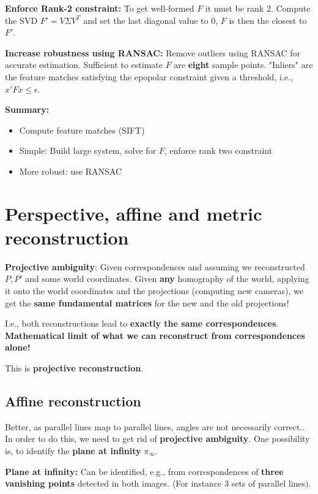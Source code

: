 \textbf{Enforce Rank-2 constraint:} To get well-formed $F$ it must be rank 2. Compute the SVD $F' = V \Sigma V^T$ and set the last diagonal value to $0$, $F$ is then the closest to $F'$.

\textbf{Increase robustness using RANSAC:} Remove outliers using RANSAC for accurate estimation. Sufficient to estimate $F$ are \textbf{eight} sample points. "Inliers" are the feature matches satisfying the epopolar constraint given a threshold, i.e., $x' F x \leq \epsilon$.

\textbf{Summary:}

\begin{itemize}
    \item Compute feature matches (SIFT)
    \item Simple: Build large system, solve for $F$, enforce rank two constraint
    \item More robust: use RANSAC
\end{itemize}

\section{Perspective, affine and metric reconstruction}

\textbf{Projective ambiguity}: Given correspondences and assuming we reconstructed $P,P'$ and some world coordinates. Given \textbf{any} homography of the world, applying it onto the world coordinates and the projections (computing new cameras), we get the \textbf{same fundamental matrices} for the new and the old projections!

I.e., both reconstructions lead to \textbf{exactly the same correspondences}. \textbf{Mathematical limit of what we can reconstruct from correspondences alone!}

This is \textbf{projective reconstruction}.

\subsection{Affine reconstruction}

Better, as parallel lines map to parallel lines, angles are not necessarily correct.. In order to do this, we need to get rid of \textbf{projective ambiguity}. One possibility is, to identify the \textbf{plane at infinity} $\pi_\infty$.

\textbf{Plane at infinity:} Can be identified, e.g., from correspondences of \textbf{three vanishing points} detected in both images. (For instance 3 sets of parallel lines).


